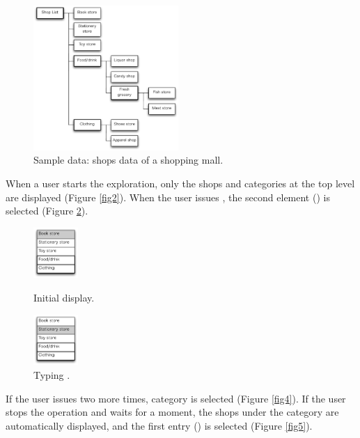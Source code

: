 \documentclass[conference]{IEEEtran}
\def\down{\tsf{▼}}
\begin{document}
\begin{figure}[H]
  \centerline{\includegraphics[width=55mm,bb=0 0 490 490]{figures/fig1.pdf}}
  \caption{Sample data: shops data of a shopping mall.}
  \label{fig1}
\end{figure}

When a user starts the exploration, only the shops and categories
at the top level are displayed (Figure \ref{fig2}).
When the user issues {\down},
the second element () is selected (Figure \ref{fig3}).

\def\menuwidth{22mm}

\begin{figure}[H]
  \begin{minipage}{0.45\hsize}
    \centerline{\includegraphics[width=17mm, bb=0 0 139 157]{figures/fig2.pdf}}
    \caption{Initial display.}
    \label{fig2}
  \end{minipage}
  \begin{minipage}{0.45\hsize}
    \centerline{\includegraphics[width=17mm,bb=0 0 139 157]{figures/fig3.pdf}}
    \caption{Typing {\down}.}
    \label{fig3}
  \end{minipage}
\end{figure}

If the user issues {\down} two more times, 
 category is selected (Figure \ref{fig4}).
If the user stops the operation and waits for a moment, the shops under the 
category are automatically displayed,
and the first entry () is selected (Figure \ref{fig5}).
\end{document}
